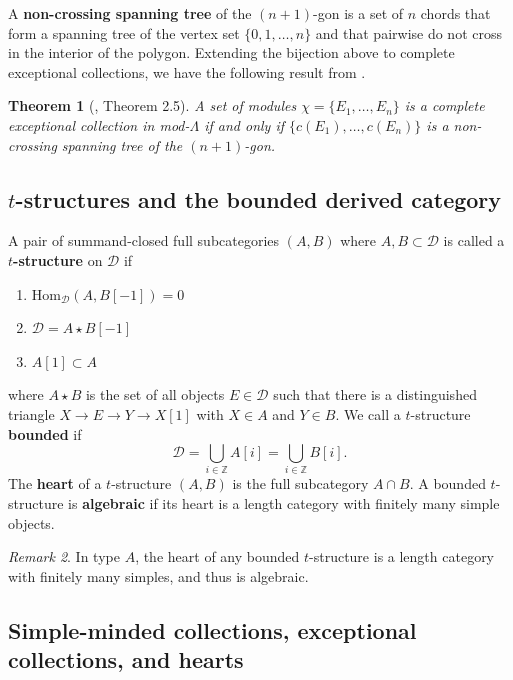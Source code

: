 \documentclass[12pt]{amsart}
\newtheorem{thm}{Theorem}[section]
\theoremstyle{definition}
\theoremstyle{remark}
\newtheorem{rem}[thm]{Remark}
\numberwithin{equation}{section}
\newcommand{\cD}{\ensuremath{{\mathcal{D}}}}
\begin{document}
A \textbf{non-crossing spanning tree} of the $(n+1)$-gon is a set of $n$ chords that form a spanning tree of the vertex set $\{0,1,\dots,n\}$ and that pairwise do not cross in the interior of the polygon. Extending the bijection above to complete exceptional collections, we have the following result from \cite{araya2013exceptional}.

\begin{thm}[\cite{araya2013exceptional}, Theorem 2.5]
    A set of modules $\chi = \{E_1, \dots, E_n\}$ is a complete exceptional collection in mod-$\Lambda$ if and only if $\{c(E_1), \dots, c(E_n)\}$ is a non-crossing spanning tree of the $(n+1)$-gon.
    \label{thm: araya}
\end{thm} 

\subsection{$t$-structures and the bounded derived category}

A pair of summand-closed full subcategories $(A,B)$ where $A,B \subset \cD$ is called a \textbf{$t$-structure} on $\cD$ if

\begin{enumerate}
\item Hom$_{\cD}(A,B[-1])=0$   
\item $\cD = A \star B[-1]$
\item $A[1] \subset A$
\end{enumerate}

where $A\star B$ is the set of all objects $E\in\cD$ such that there is a distinguished triangle $X \rightarrow E \rightarrow Y \rightarrow X[1]$ with $X \in A$ and $Y\in B$. We call a $t$-structure \textbf{bounded} if $$\cD = \bigcup_{i\in\mathbb{Z}} A[i] = \bigcup_{i\in\mathbb{Z}} B[i].$$ The \textbf{heart} of a $t$-structure $(A,B)$ is the full subcategory $A\cap B$. A bounded $t$-structure is \textbf{algebraic} if its heart is a length category with finitely many simple objects.

\begin{rem}
    In type $A$, the heart of any bounded $t$-structure is a length category with finitely many simples, and thus is algebraic.
    \label{rem: type A algebraic}
\end{rem}

\subsection{Simple-minded collections, exceptional collections, and hearts}
\end{document}

